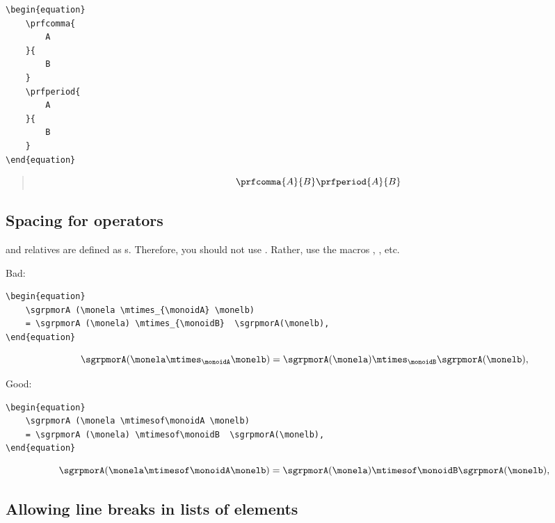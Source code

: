 \begin{verbatim}
\begin{equation}
    \prfcomma{
        A
    }{
        B
    }
    \prfperiod{
        A
    }{
        B
    }
\end{equation}
\end{verbatim}
\begin{quote}
    \begin{equation}
        \prfcomma{
            A
        }{
            B
        }
        \prfperiod{
            A
        }{
            B
        }
    \end{equation}
\end{quote}

\subsection{Spacing for operators}

 and relatives are defined as s.
Therefore, you should not use .
Rather, use the macros , , etc.

Bad:

\begin{verbatim}
\begin{equation}
    \sgrpmorA (\monela \mtimes_{\monoidA} \monelb)
    = \sgrpmorA (\monela) \mtimes_{\monoidB}  \sgrpmorA(\monelb),
\end{equation}
\end{verbatim}

\begin{equation}
    \sgrpmorA (\monela \mtimes_{\monoidA} \monelb) = \sgrpmorA (\monela) \mtimes_{\monoidB}  \sgrpmorA(\monelb),
\end{equation}

Good:

\begin{verbatim}
\begin{equation}
    \sgrpmorA (\monela \mtimesof\monoidA \monelb)
    = \sgrpmorA (\monela) \mtimesof\monoidB  \sgrpmorA(\monelb),
\end{equation}
\end{verbatim}

\begin{equation}
    \sgrpmorA (\monela \mtimesof\monoidA \monelb) = \sgrpmorA (\monela) \mtimesof\monoidB  \sgrpmorA(\monelb),
\end{equation}

\subsection{Allowing line breaks in lists of elements}

